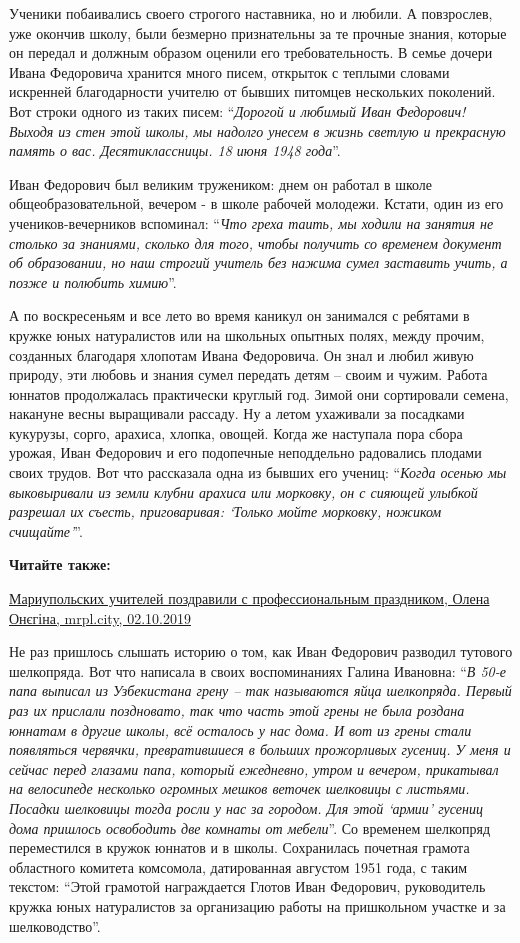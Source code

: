 Ученики побаивались своего строгого наставника, но и любили. А повзрослев, уже
окончив школу, были безмерно признательны за те прочные знания, которые он
передал и должным образом оценили его требовательность. В семье дочери Ивана
Федоровича хранится много писем, открыток с теплыми словами искренней
благодарности учителю от бывших питомцев нескольких поколений. Вот строки
одного из таких писем: \enquote{\em Дорогой и любимый Иван Федорович! Выходя из стен этой
школы, мы надолго унесем в жизнь светлую и прекрасную память о вас.
Десятиклассницы. 18 июня 1948 года}.

Иван Федорович был великим тружеником: днем он работал в школе
общеобразовательной, вечером - в школе рабочей молодежи. Кстати, один из его
учеников-вечерников вспоминал: \enquote{\em Что греха таить, мы ходили на занятия не
столько за знаниями, сколько для того, чтобы получить со временем документ об
образовании, но наш строгий учитель без нажима сумел заставить учить, а позже и
полюбить химию}. 

А по воскресеньям и все лето во время каникул он занимался с ребятами в кружке
юных натуралистов или на школьных опытных полях, между прочим, созданных
благодаря хлопотам Ивана Федоровича. Он знал и любил живую природу, эти любовь
и знания сумел передать детям – своим и чужим. Работа юннатов продолжалась
практически круглый год. Зимой они сортировали семена, накануне весны
выращивали рассаду. Ну а летом ухаживали за посадками кукурузы, сорго, арахиса,
хлопка, овощей. Когда же наступала пора сбора урожая, Иван Федорович и его
подопечные неподдельно радовались плодами своих трудов. Вот что рассказала одна
из бывших его учениц: \enquote{\em Когда осенью мы выковыривали из земли клубни арахиса или
морковку, он с сияющей улыбкой разрешал их съесть, приговаривая: \enquote{Только мойте
морковку, ножиком счищайте}}.

\textbf{Читайте также:} 

\href{https://mrpl.city/news/view/mariupolskih-uchitelej-pozdravili-s-professionalnym-prazdnikom-foto}{%
Мариупольских учителей поздравили с профессиональным праздником, Олена Онєгіна, mrpl.city, 02.10.2019}

Не раз пришлось слышать историю о том, как Иван Федорович разводил тутового
шелкопряда. Вот что написала в своих воспоминаниях Галина Ивановна: \enquote{\em В 50-е
папа выписал из Узбекистана грену – так называются яйца шелкопряда. Первый раз
их прислали поздновато, так что часть этой грены не была роздана юннатам в
другие школы, всё осталось у нас дома. И вот из грены стали появляться
червячки, превратившиеся в больших прожорливых гусениц. У меня и сейчас перед
глазами папа, который ежедневно, утром и вечером, прикатывал на велосипеде
несколько огромных мешков веточек шелковицы с листьями. Посадки шелковицы тогда
росли у нас за городом. Для этой \enquote{армии} гусениц дома пришлось освободить две
комнаты от мебели}. Со временем шелкопряд переместился в кружок юннатов и в
школы. Сохранилась почетная грамота областного комитета комсомола, датированная
августом 1951 года, с таким текстом: \enquote{Этой грамотой награждается Глотов Иван
Федорович, руководитель кружка юных натуралистов за организацию работы на
пришкольном участке и за шелководство}.

